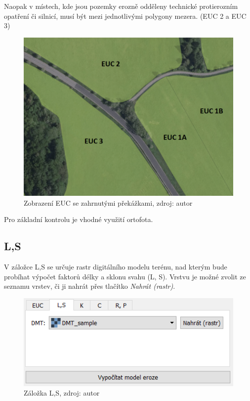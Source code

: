 Naopak v místech, kde jsou pozemky erozně odděleny technické
protierozním opatření či silnicí, musí být mezi jednotlivými polygony
mezera. (EUC 2 a EUC 3)
\begin{figure}[H] \centering
		\includegraphics[width=.7\textwidth]{./pictures/rozdeleni_euc.png}
		\caption[Zobrazení EUC se zahrnutými
překážkami]{Zobrazení EUC se zahrnutými překážkami, zdroj: autor}
		\label{rozdeleni_euc}
\end{figure} Pro základní kontrolu je vhodné využití ortofota.
\subsection{L,S} V záložce L,S se určuje rastr digitálního modelu
terénu, nad kterým bude probíhat výpočet faktorů délky a sklonu svahu
(L, S). Vrstvu je možné zvolit ze seznamu vrstev, či ji nahrát přes
tlačítko \textit{Nahrát (rastr)}.
\begin{figure}[H] \centering
		\includegraphics[width=.6\textwidth]{./pictures/ls.png}
		\caption[Záložka L,S]{Záložka L,S, zdroj: autor}
		\label{zalozka_ls}
\end{figure}
